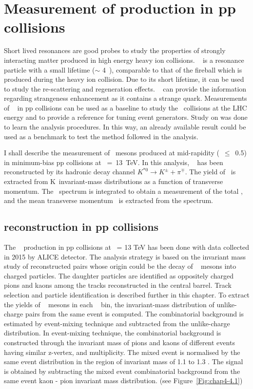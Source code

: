 \chapter{Measurement of \kzero production in pp collisions}
\label{cap:4}


\vspace*{2cm}
Short lived resonances are good probes to study the properties of strongly interacting matter produced in high energy heavy ion collisions. \kzero~ is a resonance particle with a small lifetime ($\sim$ 4~\fmc), comparable to that of the fireball which is produced during the heavy ion collision. Due to its short lifetime, it can be used to study the re-scattering and regeneration effects. \kzero~ can provide the information regarding strangeness enhancement as it contains a strange quark. Measurements of \kzero~ in pp collisions can be used as a baseline to study the \PbPb~collisions at the LHC energy and to provide a reference for tuning event generators. Study on \kzero was done to learn the analysis procedures. In this way, an already available result could be used as a benchmark to test the method followed in the analysis.


I shall describe the measurement of \kzero~mesons produced at mid-rapidity (\modrap~$\leq$~0.5) in minimum-bias pp collisions at \sqrtS~=~13~TeV. In this analysis, \kzero~ has been reconstructed by its hadronic decay channel $K^{*0} \rightarrow K^{\pm}+ \pi^{\mp}$. The yield of \kzero~is extracted from \pion K~invariant-mass distributions as a function of transverse momentum.  The \pT~spectrum is integrated to obtain a measurement of the total \dndy, and the mean transverse momentum \meanpT~is extracted from the spectrum. 


\section{\kzero reconstruction in pp collisions}
\label{par:4.1}
The \kzero~ production in pp collisions at \sqrtS~= 13 TeV has been done with data collected in 2015 by ALICE detector. The analysis strategy is based on the invariant mass study of reconstructed pairs whose origin could be the decay of \kzero~ mesons into charged particles. The daughter particles are identified as oppositely charged pions and kaons among the tracks reconstructed in the central barrel. Track selection and particle identification is described further in this chapter. To extract the yields of \kzero~ mesons in each \pT~ bin, the invariant-mass distribution of unlike-charge pairs from the same event is computed. The combinatorial background is estimated by event-mixing technique and subtracted from the unlike-charge distribution. In event-mixing technique, the combinatorial background is constructed through the invariant mass of pions and kaons of different events having similar z-vertex, and multiplicity. The mixed event is normalised by the same event distribution in the region of invariant mass of 1.1 to 1.3 \GeVcSq. The signal is obtained by subtracting the mixed event combinatorial background from the same event kaon - pion invariant mass distribution. (see \mbox{Figure \ref{Fig:chap4-4.1}})


